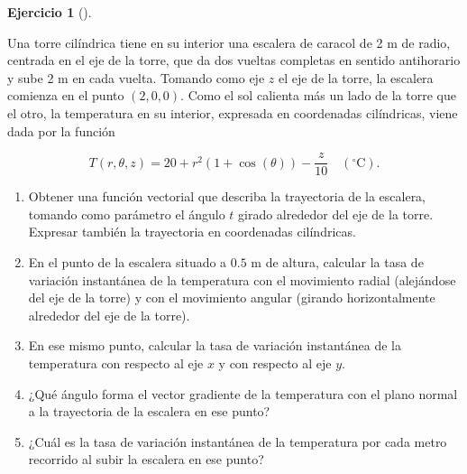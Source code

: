 \documentclass[
  spanish,
  a4paper,
]{scrreport}
\theoremstyle{definition}
\newtheorem{exercise}{Ejercicio}[chapter]
\theoremstyle{remark}
\begin{document}
\begin{exercise}[]\protect\hypertarget{exr-3}{}\label{exr-3}

Una torre cilíndrica tiene en su interior una escalera de caracol de 2 m
de radio, centrada en el eje de la torre, que da dos vueltas completas
en sentido antihorario y sube 2 m en cada vuelta. Tomando como eje \(z\)
el eje de la torre, la escalera comienza en el punto \((2,0,0)\). Como
el sol calienta más un lado de la torre que el otro, la temperatura en
su interior, expresada en coordenadas cilíndricas, viene dada por la
función

\[
T(r,\theta,z) = 20 + r^2(1+\cos(\theta)) - \frac{z}{10} \quad (^\circ\mathrm{C}).
\]

\begin{enumerate}
\def\labelenumi{\alph{enumi}.}
\item
  Obtener una función vectorial que describa la trayectoria de la
  escalera, tomando como parámetro el ángulo \(t\) girado alrededor del
  eje de la torre. Expresar también la trayectoria en coordenadas
  cilíndricas.
\item
  En el punto de la escalera situado a \(0.5\) m de altura, calcular la
  tasa de variación instantánea de la temperatura con el movimiento
  radial (alejándose del eje de la torre) y con el movimiento angular
  (girando horizontalmente alrededor del eje de la torre).
\item
  En ese mismo punto, calcular la tasa de variación instantánea de la
  temperatura con respecto al eje \(x\) y con respecto al eje \(y\).
\item
  ¿Qué ángulo forma el vector gradiente de la temperatura con el plano
  normal a la trayectoria de la escalera en ese punto?
\item
  ¿Cuál es la tasa de variación instantánea de la temperatura por cada
  metro recorrido al subir la escalera en ese punto?
\end{enumerate}

\end{exercise}
\end{document}
